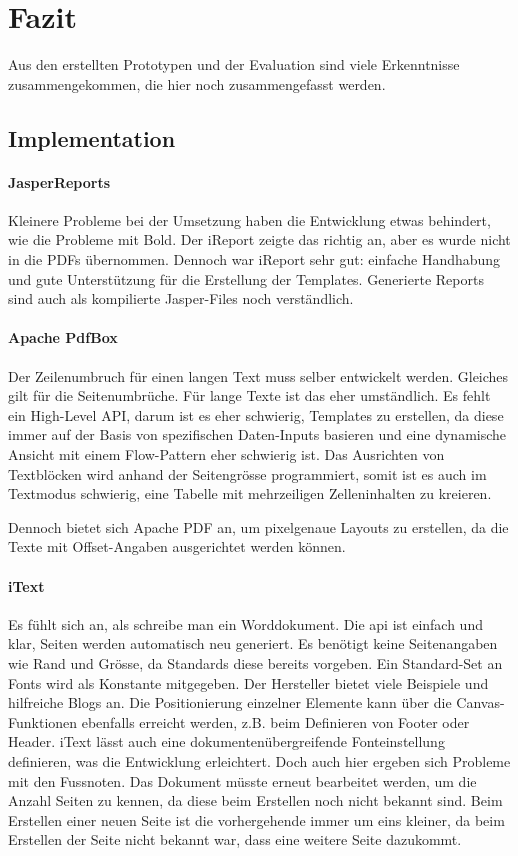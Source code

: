 \documentclass[main.tex]{subfiles}
\begin{document}
\chapter{Fazit}

Aus den erstellten Prototypen und der Evaluation sind viele Erkenntnisse zusammengekommen, die hier noch zusammengefasst werden. 

\section{Implementation}

\subsubsection{JasperReports}
Kleinere Probleme bei der Umsetzung haben die Entwicklung etwas behindert, wie die Probleme mit Bold. Der iReport zeigte das richtig an, aber es wurde nicht in die PDFs übernommen. Dennoch war iReport sehr gut: einfache Handhabung und gute Unterstützung für die Erstellung der Templates. Generierte Reports sind auch als kompilierte Jasper-Files noch verständlich.  


\subsubsection{Apache PdfBox}
Der Zeilenumbruch für einen langen Text muss selber entwickelt werden. Gleiches gilt für die Seitenumbrüche. Für lange Texte ist das eher umständlich. Es fehlt ein High-Level API, darum ist es eher schwierig, Templates zu erstellen, da diese immer auf der Basis von spezifischen Daten-Inputs basieren und eine dynamische Ansicht mit einem Flow-Pattern eher schwierig ist. Das Ausrichten von Textblöcken wird anhand der Seitengrösse programmiert, somit ist es auch im Textmodus schwierig, eine Tabelle mit mehrzeiligen Zelleninhalten zu kreieren.

Dennoch bietet sich Apache PDF an, um pixelgenaue Layouts zu erstellen, da die Texte mit Offset-Angaben ausgerichtet werden können.

\subsubsection{iText}
Es fühlt sich an, als schreibe man ein Worddokument. Die \acrlong{api} ist einfach und klar, Seiten werden automatisch neu generiert. Es benötigt keine Seitenangaben wie Rand und Grösse, da Standards diese bereits vorgeben. Ein Standard-Set an Fonts wird als Konstante mitgegeben. Der Hersteller bietet viele Beispiele und hilfreiche Blogs an. Die Positionierung einzelner Elemente kann über die Canvas-Funktionen ebenfalls erreicht werden, z.B. beim Definieren von Footer oder Header. iText lässt auch eine dokumentenübergreifende Fonteinstellung definieren, was die Entwicklung erleichtert. Doch auch hier ergeben sich Probleme mit den Fussnoten. Das Dokument müsste erneut bearbeitet werden, um die Anzahl Seiten zu kennen, da diese beim Erstellen noch nicht bekannt sind. Beim Erstellen einer neuen Seite ist die vorhergehende immer um eins kleiner, da beim Erstellen der Seite nicht bekannt war, dass eine weitere Seite dazukommt.
\end{document}
